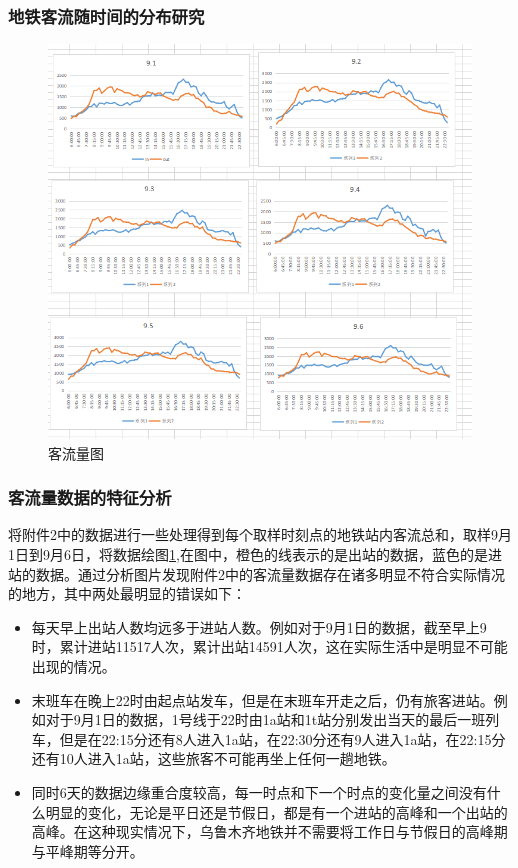 \documentclass[12pt,a4paper]{mcmthesis}
\begin{document}
    \subsubsection{地铁客流随时间的分布研究}
    \begin{figure}[h!t]
        \centerline{\includegraphics[scale=0.8]{figures/客流图}\quad }
        \caption{\song\wuhao  客流量图}
        \label{fig:客流量}
    \end{figure}

    \subsubsection{客流量数据的特征分析}

    将附件2中的数据进行一些处理得到每个取样时刻点的地铁站内客流总和，取样9月1日到9月6日，将数据绘图\ref{fig:客流量},在图中，橙色的线表示的是出站的数据，蓝色的是进站的数据。通过分析图片发现附件2中的客流量数据存在诸多明显不符合实际情况的地方，其中两处最明显的错误如下：

    \begin{itemize}
        \item 每天早上出站人数均远多于进站人数。例如对于9月1日的数据，截至早上9时，累计进站11517人次，累计出站14591人次，这在实际生活中是明显不可能出现的情况。
        \item 末班车在晚上22时由起点站发车，但是在末班车开走之后，仍有旅客进站。例如对于9月1日的数据，1号线于22时由1a站和1t站分别发出当天的最后一班列车，但是在22:15分还有8人进入1a站，在22:30分还有9人进入1a站，在22:15分还有10人进入1a站，这些旅客不可能再坐上任何一趟地铁。
        \item 同时6天的数据边缘重合度较高，每一时点和下一个时点的变化量之间没有什么明显的变化，无论是平日还是节假日，都是有一个进站的高峰和一个出站的高峰。在这种现实情况下，乌鲁木齐地铁并不需要将工作日与节假日的高峰期与平峰期等分开。
    \end{itemize}
\end{document}
